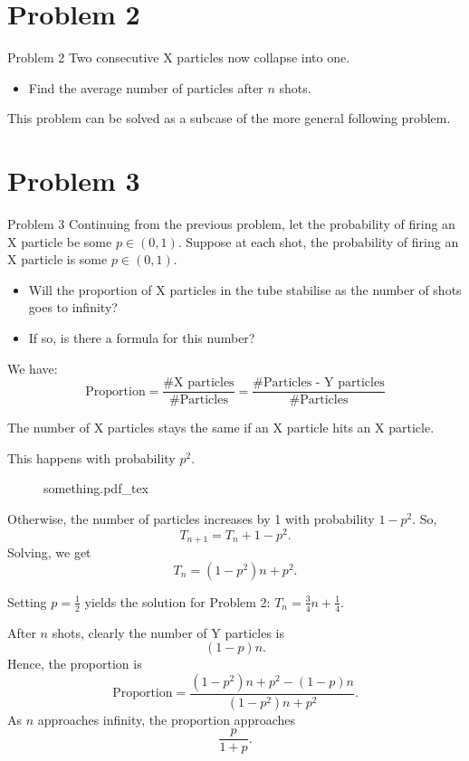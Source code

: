 \documentclass[xcolor={usenames,dvipsnames}]{beamer}
\newcommand{\incfig}[1]{%
  \def\svgwidth{0.3\textwidth}
  {#1.pdf_tex}
}
\begin{document}
\section{Problem 2}
\begin{frame}{Problem 2}
  Two consecutive X particles now collapse into one. 
  \begin{itemize}
    \item Find the average number of particles after $n$ shots.
  \end{itemize}

  This problem can be solved as a subcase of the more general following problem.
\end{frame}

\section{Problem 3}
\begin{frame}{Problem 3}
  Continuing from the previous problem, let the probability of firing an X particle be some  $p \in (0, 1)$.
  Suppose at each shot, the probability of firing an X particle is  some $p \in (0, 1)$.
  \begin{itemize}
    \item Will the proportion of X particles in the tube stabilise as the number of shots goes to infinity?
    \item If so, is there a formula for this number?
  \end{itemize}
  We have:
  \begin{equation*}
    \text{Proportion} = \frac{\#\text{X particles}}{\#\text{Particles}} = \frac{\#\text{Particles - Y particles}}{\#\text{Particles}}
  \end{equation*}
\end{frame}

\begin{frame}
  The number of X particles stays the same if an X particle hits an X particle.

  This happens with probability $p^2$.

  \begin{multicols}{2}
  \begin{figure}[ht]
    \centering
    \incfig{something}
    \label{fig:stuff}
  \end{figure}
  \columnbreak
  Otherwise, the number of particles increases by 1 with probability $1-p^2$. So, \[
    T_{n+1} = T_n + 1-p^2
  .\] Solving, we get \[
    T_n = (1-p^2)n + p^2
    .\] \end{multicols}
    Setting $p = \frac{1}{2}$ yields the solution for Problem 2: $
    T_n = \frac{3}{4}n + \frac{1}{4}
  $.
\end{frame}
\begin{frame}
  After $n$ shots, clearly the number of Y particles is \[
    (1-p)n
  .\] Hence, the proportion is 
  \begin{equation*}
    \text{Proportion} = \frac{(1-p^2)n + p^2 - (1-p)n}{(1-p^2)n + p^2}.
\end{equation*}
As $n$ approaches infinity, the proportion approaches \[
  \frac{p}{1+p}
.\] 
\end{frame}
\end{document}
